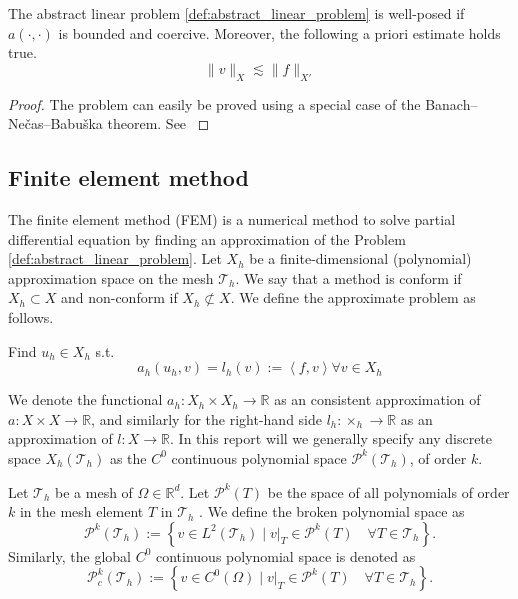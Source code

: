 \begin{lemma}
    \label{def:lax-milgram}
    The abstract linear problem \ref{def:abstract_linear_problem} is well-posed if $a(\cdot , \cdot  ) $ is bounded and coercive. Moreover, the following a priori estimate holds true.\[
    \| v \|_{ X }^{  } \lesssim  \| f \|_{ X'  }^{  }
    \]
\end{lemma}
\begin{proof}
    The problem can easily be proved using a special case of the Banach–Nečas–Babuška theorem. See \cite[Lemma 1.4]{pietro2012}
\end{proof}



\subsection{Finite element method}%
\label{sub:finite_element_method}


The finite element method (FEM) is a numerical method to solve partial differential equation by finding an approximation of the Problem \ref{def:abstract_linear_problem}.  Let $X_{h}$ be a finite-dimensional (polynomial) approximation space on the mesh
$\mathcal{T} _{h}$. We say that a method is conform if $X_{h}\subset X $ and non-conform if $X _{h} \not\subset X$. We define the approximate problem as follows.
\begin{problem}
    \label{def:approx_problem}
    Find  $u_{h} \in X_{h}$ s.t. \[
    a_{h}(u_{h},v ) = l_{h}( v) :=  \left<f,v \right>   \forall v \in X_{h}
    \]
\end{problem}

We denote the functional $a_{h}: X_{h} \times X_{h} \to \mathbb{R} $ as an consistent approximation of $a: X \times X \to \mathbb{R} $, and similarly for the right-hand side $l_{h} : \times _{h} \to \mathbb{R} $ as an approximation of $l: X \to \mathbb{R} $.
In this report will we generally specify any discrete space $X_{h}(\mathcal{T}_{h})$  as the $C^{0}$ continuous polynomial space $\mathcal{P}^{k}(\mathcal{T}_{h})$, of order $k$.

\begin{definition}
    Let $\mathcal{T}_{h} $ be a mesh of $\Omega \in \mathbb{R} ^{d} $. Let $\mathcal{P}^{k}(T) $ be the space of all polynomials of order $k$ in the mesh element $T$ in $\mathcal{T}_{h}$ . We define the broken polynomial space as \[
    \mathcal{P}^{k} ( \mathcal{T}_{h} ) := \left\{ v \in L^{2}( \mathcal{T}_{h} )    \mid  v|_{T} \in \mathcal{P}^k( T) \quad  \forall T \in  \mathcal{T}_{h}   \right\}.
    \]
    Similarly, the global $C^{0}$ continuous polynomial space is denoted as
    \[
    \mathcal{P}^{k}_{c} ( \mathcal{T}_{h} ) := \left\{ v \in C^{0}( \Omega )   \mid  v|_{T} \in \mathcal{P}^k( T) \quad  \forall T \in  \mathcal{T}_{h}   \right\}.
    \]

\end{definition}



